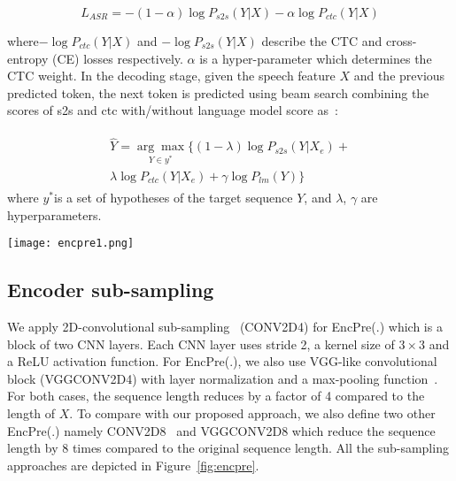 \documentclass{article}
\begin{document}
\begin{equation}
L_{ASR}=-(1-\alpha) \log P_{s2s}(Y|X)-\alpha \log P_{ctc}(Y|X)    
\end{equation}

where$-\log P_{ctc}(Y|X)$ and $-\log P_{s2s}(Y|X)$ describe the CTC and cross-entropy (CE) losses respectively. $\alpha$ is a hyper-parameter which determines the CTC weight.    
In the decoding stage, given the speech feature $X$ and the previous predicted token, the next token is predicted using beam search combining the scores of s2s and ctc with/without language model score as~\citep{karita2019asru}:

\begin{align}
\begin{split}
\hat{Y}=\underset{Y \in y^*}{\arg\max}\{(1-\lambda) \log P_{s2s}(Y|X_e)+ \\ \lambda \log P_{ctc}(Y|X_e) + \gamma \log P_{lm}(Y)\}  
\end{split}
\end{align}
where $y^*$is a set of hypotheses of the target sequence $Y$, and $\lambda$, $\gamma$ are hyperparameters.

\begin{figure*}[ht]
\vskip 0.2in
    \begin{center}
    \centerline{\texttt{[image: encpre1.png]}}
\caption{Different types of Encoder sub-sampling. (a) CONV2D4, (b) CONV2D8, (c) VGGCONV2D4, and (d) VGGCONV2D8}
    \label{fig:encpre}
    \end{center}
\vskip -0.2in
\end{figure*}
\subsection{Encoder sub-sampling}

We apply 2D-convolutional sub-sampling~\citep{karita2019asru} (CONV2D4) for EncPre(.) which is a block of two CNN layers. Each CNN layer uses stride 2, a kernel size of $3\times3$ and a ReLU activation function. For EncPre(.), we also use VGG-like convolutional block (VGGCONV2D4) with layer normalization and a max-pooling function~\citep{wang2020a}. For both cases, the sequence length reduces by a factor of 4 compared to the length of $X$. To compare with our proposed approach, we also define two other EncPre(.) namely CONV2D8~\citep{espnet} and VGGCONV2D8 which reduce the sequence length by 8 times compared to the original sequence length. 
All the sub-sampling approaches are depicted in Figure~\ref{fig:encpre}. 
\end{document}
